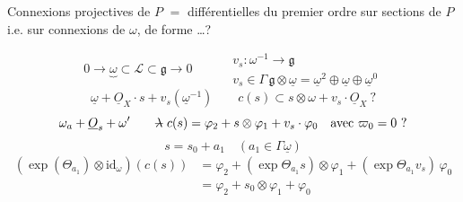 \documentclass[11pt,a4paper]{article}
\begin{document}
Connexions projectives de $P$ $=$ \emph{} différentielles du premier ordre sur sections de $P$ i.e. sur connexions de $\omega$, de  forme \ldots ?

\[
0 \to \underbrace{\omega}_{} \subset \mathcal{L} \subset \mathfrak{g} \to 0
\qquad
\begin{aligned}
&v_s : \omega^{-1} \to \mathfrak{g}\\
&v_s \in \Gamma\,\mathfrak{g}\otimes\underline{\omega} = \underline{\omega}^2\oplus\underline{\omega}\oplus\underline{\omega}^0
\end{aligned}
\]
\[
\underline{\omega} + \underline{O}_X\cdot s + v_s(\underline{\omega}^{-1}) \qquad c(s) \subset s\otimes\omega + v_s\cdot\underline{O}_X\ ?
\]
\[
\omega_a + \underline{O}_s + \omega' \qquad
\text{\struck{$\lambda$}}\ c(s) = \varphi_2 + s\otimes\varphi_1 + v_s\cdot\varphi_0
\quad \text{avec } \varpi_0 = 0\ ?
\]
\[
s = s_0 + a_1 \quad (a_1\in\Gamma\underline{\omega})
\]
\[
\begin{aligned}
(\exp(\Theta_{a_1})\otimes\mathrm{id}_{\omega})(c(s)) &= \varphi_2 + (\exp\Theta_{a_1} s)\otimes\varphi_1 + (\exp\Theta_{a_1} v_s)\,\varphi_0\\
&= \varphi_2 + s_0\otimes\varphi_1 + \varphi_0
\end{aligned}
\]
\end{document}
